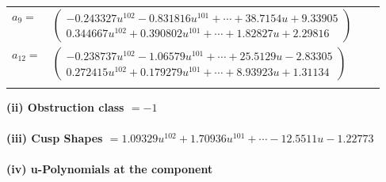 \documentclass[1p]{elsarticle_modified}
\theoremstyle{definition}
\begin{document}
\begin{tabular}{m{7pt} m{180pt} m{7pt} m{180pt} }
\flushright $a_{9}=$&$\begin{pmatrix}-0.243327 u^{102}-0.831816 u^{101}+\cdots+38.7154 u+9.33905\\0.344667 u^{102}+0.390802 u^{101}+\cdots+1.82827 u+2.29816\end{pmatrix}$ \\
\flushright $a_{12}=$&$\begin{pmatrix}-0.238737 u^{102}-1.06579 u^{101}+\cdots+25.5129 u-2.83305\\0.272415 u^{102}+0.179279 u^{101}+\cdots+8.93923 u+1.31134\end{pmatrix}$\\&\end{tabular}
\flushleft \textbf{(ii) Obstruction class $= -1$}\\~\\
\flushleft \textbf{(iii) Cusp Shapes $= 1.09329 u^{102}+1.70936 u^{101}+\cdots-12.5511 u-1.22773$}\\~\\
\newpage\renewcommand{\arraystretch}{1}
\flushleft \textbf{(iv) u-Polynomials at the component}\newline \\
\end{document}
